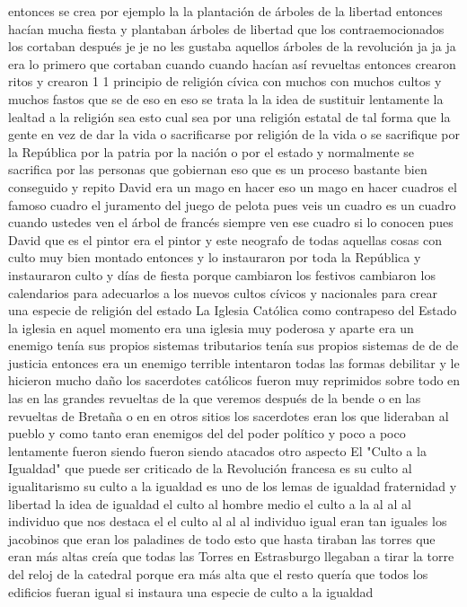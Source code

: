 entonces se crea por ejemplo la la plantación de árboles de la libertad entonces hacían mucha fiesta y plantaban árboles de libertad
que los contraemocionados los cortaban después je je no les gustaba aquellos árboles de la revolución ja ja ja era lo primero que cortaban
cuando cuando hacían así revueltas entonces crearon ritos y crearon 1 1 principio de religión cívica
con muchos con muchos cultos y muchos fastos que se de eso en eso se trata la la idea
de sustituir lentamente la lealtad a la religión sea esto cual sea por una religión estatal
de tal forma que la gente en vez de dar la vida o sacrificarse por religión de la vida o se sacrifique por la República
por la patria por la nación o por el estado y normalmente se sacrifica por las personas que gobiernan eso
que es un proceso bastante bien conseguido y repito David era un mago en hacer eso un mago en hacer cuadros el famoso cuadro el juramento
del juego de pelota pues veis un cuadro es un cuadro cuando ustedes ven el árbol de francés siempre ven ese cuadro
si lo conocen pues David que es el pintor era el pintor y este neografo de todas aquellas
cosas con culto muy bien montado entonces y lo instauraron por toda la República y instauraron culto y días de fiesta
porque cambiaron los festivos cambiaron los calendarios para adecuarlos a los nuevos cultos cívicos y nacionales
para crear una especie de religión del estado
La Iglesia Católica como contrapeso del Estado
la iglesia en aquel momento era una iglesia muy poderosa y aparte era un enemigo tenía sus propios sistemas tributarios
tenía sus propios sistemas de de de justicia entonces era un enemigo terrible intentaron
todas las formas debilitar y le hicieron mucho daño los sacerdotes católicos fueron muy reprimidos
sobre todo en las en las grandes revueltas de la que veremos después de la bende o en las revueltas de Bretaña o en en otros sitios
los sacerdotes eran los que lideraban al pueblo y como tanto eran enemigos del del poder político y poco a poco
lentamente fueron siendo fueron siendo atacados otro aspecto
El "Culto a la Igualdad"
que puede ser criticado de la Revolución francesa es su
culto al igualitarismo su culto a la igualdad es uno de los lemas de igualdad fraternidad y libertad
la idea de igualdad el culto al hombre medio el culto a la al al al individuo que nos destaca
el el culto al al al individuo igual eran tan iguales los jacobinos que eran los paladines de todo esto
que hasta tiraban las torres que eran más altas creía que todas las Torres en Estrasburgo llegaban a tirar la torre del reloj de la catedral
porque era más alta que el resto quería que todos los edificios fueran igual si instaura una especie de culto a la igualdad
